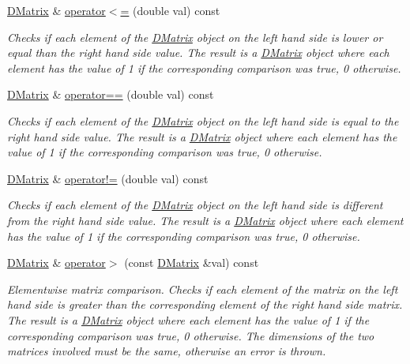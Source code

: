 \begin{DoxyCompactItemize}
\hyperlink{classDMatrix}{DMatrix} \& \hyperlink{classDMatrix_a2f0eadd7bb2b7afc5e6109243a839c1d}{operator$<$=} (double val) const 
\begin{DoxyCompactList}\small\item\em Checks if each element of the \hyperlink{classDMatrix}{DMatrix} object on the left hand side is lower or equal than the right hand side value. The result is a \hyperlink{classDMatrix}{DMatrix} object where each element has the value of 1 if the corresponding comparison was true, 0 otherwise. \item\end{DoxyCompactList}\item 
\hyperlink{classDMatrix}{DMatrix} \& \hyperlink{classDMatrix_a02a8277b7f165d774d6463f284bb71b4}{operator==} (double val) const 
\begin{DoxyCompactList}\small\item\em Checks if each element of the \hyperlink{classDMatrix}{DMatrix} object on the left hand side is equal to the right hand side value. The result is a \hyperlink{classDMatrix}{DMatrix} object where each element has the value of 1 if the corresponding comparison was true, 0 otherwise. \item\end{DoxyCompactList}\item 
\hyperlink{classDMatrix}{DMatrix} \& \hyperlink{classDMatrix_a475f14adcb18e617464bd66021fc4ca2}{operator!=} (double val) const 
\begin{DoxyCompactList}\small\item\em Checks if each element of the \hyperlink{classDMatrix}{DMatrix} object on the left hand side is different from the right hand side value. The result is a \hyperlink{classDMatrix}{DMatrix} object where each element has the value of 1 if the corresponding comparison was true, 0 otherwise. \item\end{DoxyCompactList}\item 
\hyperlink{classDMatrix}{DMatrix} \& \hyperlink{classDMatrix_a1cb2ee04434b9874b01bc1494f49c639}{operator$>$} (const \hyperlink{classDMatrix}{DMatrix} \&val) const 
\begin{DoxyCompactList}\small\item\em Elementwise matrix comparison. Checks if each element of the matrix on the left hand side is greater than the corresponding element of the right hand side matrix. The result is a \hyperlink{classDMatrix}{DMatrix} object where each element has the value of 1 if the corresponding comparison was true, 0 otherwise. The dimensions of the two matrices involved must be the same, otherwise an error is thrown. \item\end{DoxyCompactList}\item 

\end{DoxyCompactItemize}
